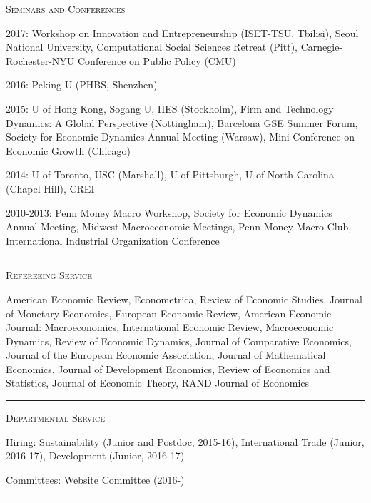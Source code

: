 \documentclass{article}
\begin{document}
\parbox{\textwidth}{
\parbox[t]{0.28\textwidth}{ \raggedright \noindent \textsc{ Seminars and Conferences } }
\parbox[t]{0.72\textwidth}{ \raggedright

2017: Workshop on Innovation and Entrepreneurship (ISET-TSU, Tbilisi), Seoul National University, Computational Social Sciences Retreat (Pitt), Carnegie-Rochester-NYU Conference on Public Policy (CMU)
\vspace{0.27cm}

2016: Peking U (PHBS, Shenzhen)
\vspace{0.27cm}

2015: U of Hong Kong, Sogang U, IIES (Stockholm), Firm and Technology Dynamics: A Global Perspective (Nottingham), Barcelona GSE Summer Forum, Society for Economic Dynamics Annual Meeting (Warsaw), Mini Conference on Economic Growth (Chicago)
\vspace{0.27cm}

2014: U of Toronto, USC (Marshall), U of Pittsburgh, U of North Carolina (Chapel Hill), CREI
\vspace{0.27cm}

2010-2013: Penn Money Macro Workshop, Society for Economic Dynamics Annual Meeting, Midwest Macroeconomic Meetings, Penn Money Macro Club, International Industrial Organization Conference
\vspace{0.27cm}

}
\textcolor{light-gray}{\hrule}
}
\vspace{0.3cm}

\parbox{\textwidth}{
\parbox[t]{0.28\textwidth}{ \raggedright \noindent \textsc{ Refereeing Service } }
\parbox[t]{0.72\textwidth}{ \raggedright

American Economic Review, Econometrica, Review of Economic Studies, Journal of Monetary Economics, European Economic Review, American Economic Journal: Macroeconomics, International Economic Review, Macroeconomic Dynamics, Review of Economic Dynamics, Journal of Comparative Economics, Journal of the European Economic Association, Journal of Mathematical Economics, Journal of Development Economics, Review of Economics and Statistics, Journal of Economic Theory, RAND Journal of Economics
\vspace{0.27cm}

}
\textcolor{light-gray}{\hrule}
}
\vspace{0.3cm}

\parbox{\textwidth}{
\parbox[t]{0.28\textwidth}{ \raggedright \noindent \textsc{ Departmental Service } }
\parbox[t]{0.72\textwidth}{ \raggedright

Hiring: Sustainability (Junior and Postdoc, 2015-16), International Trade (Junior, 2016-17), Development (Junior, 2016-17)
\vspace{0.27cm}

Committees: Website Committee (2016-)
\vspace{0.27cm}

}
\textcolor{light-gray}{\hrule}
}
\vspace{0.3cm}
\end{document}
